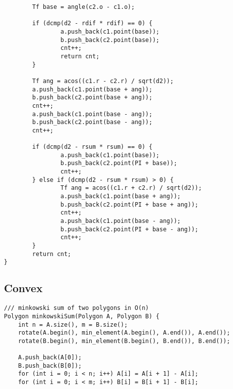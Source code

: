 \documentclass[FSZ,a4paper,onesided]{article}
\begin{document}
\begin{multicols*}{\COLS}
\begin{lstlisting}
        Tf base = angle(c2.o - c1.o);
        
        if (dcmp(d2 - rdif * rdif) == 0) {
                a.push_back(c1.point(base));
                b.push_back(c2.point(base));
                cnt++;
                return cnt;
        }

        Tf ang = acos((c1.r - c2.r) / sqrt(d2));
        a.push_back(c1.point(base + ang));
        b.push_back(c2.point(base + ang));
        cnt++;
        a.push_back(c1.point(base - ang));
        b.push_back(c2.point(base - ang));
        cnt++;

        if (dcmp(d2 - rsum * rsum) == 0) {
                a.push_back(c1.point(base));
                b.push_back(c2.point(PI + base));
                cnt++;
        } else if (dcmp(d2 - rsum * rsum) > 0) {
                Tf ang = acos((c1.r + c2.r) / sqrt(d2));
                a.push_back(c1.point(base + ang));
                b.push_back(c2.point(PI + base + ang));
                cnt++;
                a.push_back(c1.point(base - ang));
                b.push_back(c2.point(PI + base - ang));
                cnt++;
        }
        return cnt;
}
\end{lstlisting}
\subsection{Convex}
\begin{lstlisting}
/// minkowski sum of two polygons in O(n)
Polygon minkowskiSum(Polygon A, Polygon B) {
    int n = A.size(), m = B.size();
    rotate(A.begin(), min_element(A.begin(), A.end()), A.end());
    rotate(B.begin(), min_element(B.begin(), B.end()), B.end());

    A.push_back(A[0]);
    B.push_back(B[0]);
    for (int i = 0; i < n; i++) A[i] = A[i + 1] - A[i];
    for (int i = 0; i < m; i++) B[i] = B[i + 1] - B[i];


\end{lstlisting}
\end{multicols*}
\end{document}
